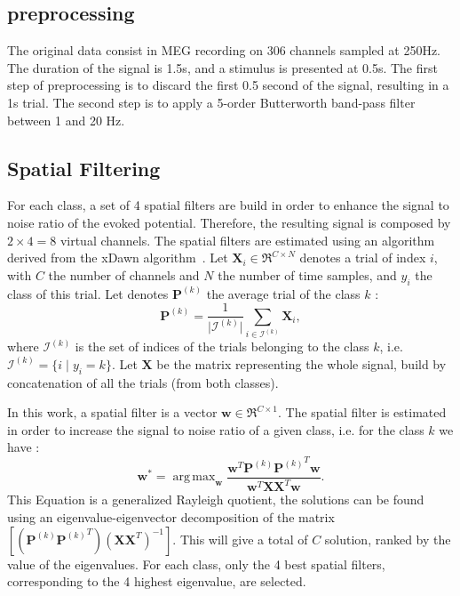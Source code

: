 \documentclass[11pt,a4paper]{article}
\newcommand{\argmax}{\mathop{\mathrm{arg\,max}}}
\begin{document}
\subsection{preprocessing}
The original data consist in MEG recording on 306 channels sampled at 250Hz. The duration of the signal is 1.5s, and a stimulus is presented at 0.5s. The first step of preprocessing is to discard the first 0.5 second of the signal, resulting in a 1s trial. The second step is to apply a 5-order Butterworth band-pass filter between 1 and 20 Hz.
\subsection{Spatial Filtering}
For each class, a set of 4 spatial filters are build in order to enhance the signal to noise ratio of the evoked potential. Therefore, the resulting signal is composed by $2\times 4 = 8 $ virtual channels. The spatial filters are estimated using an algorithm derived from the xDawn algorithm~\cite{xdawn}.
Let $\mathbf{X}_i \in \Re^{C \times N}$ denotes a trial of index $i$, with $C$ the number of channels and $N$ the number of time samples, and $y_i$ the class of this trial. Let denotes $\mathbf{P}^{(k)}$ the average trial of the class $k$ : 
\begin{equation}
\mathbf{P}^{(k)} = \frac{1}{\vert\mathcal{I}^{(k)} \vert} \sum_{i\in\mathcal{I}^{(k)}}\mathbf{X}_i,
\end{equation}
where $\mathcal{I}^{(k)}$ is the set of indices of the trials belonging to the class $k$, i.e. $\mathcal{I}^{(k)} = \lbrace i \; \vert \; y_i = k \rbrace$. Let $\mathbf{X}$ be the matrix representing the whole signal, build by concatenation of all the trials (from both classes). 

In this work, a spatial filter is a vector $\mathbf{w} \in \Re^{C \times 1}$. The spatial filter is estimated in order to increase the signal to noise ratio of a given class, i.e. for the class $k$ we have : 
\begin{equation}
\mathbf{w}^* = \argmax_{\mathbf{w}} \frac{\mathbf{w}^T \mathbf{P}^{(k)} {\mathbf{P}^{(k)}}^T \mathbf{w}}{\mathbf{w}^T\mathbf{X} \mathbf{X}^T  \mathbf{w}}.
\end{equation}
This Equation is a generalized Rayleigh quotient, the solutions can be found using an eigenvalue-eigenvector decomposition of the matrix $[(\mathbf{P}^{(k)} {\mathbf{P}^{(k)}}^T)(\mathbf{X} \mathbf{X}^T)^{-1}]$. This will give a total of $C$ solution, ranked by the value of the eigenvalues. For each class, only the 4 best spatial filters, corresponding to the 4 highest eigenvalue, are selected. 
\end{document}
